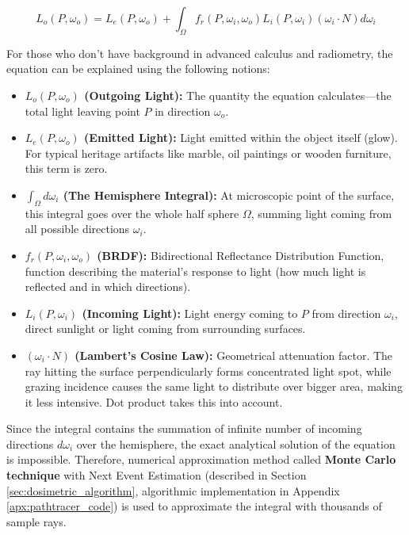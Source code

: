 \begin{equation}
    L_o(P, \omega_o) = L_e(P, \omega_o) + \int_{\Omega} f_r(P, \omega_i, \omega_o) L_i(P, \omega_i) (\omega_i \cdot N) d\omega_i
\end{equation}

For those who don't have background in advanced calculus and radiometry, the equation can be explained using the following notions:
\begin{itemize}
    \item \textbf{$L_o(P, \omega_o)$ (Outgoing Light):} The quantity the equation calculates—the total light leaving point $P$ in direction $\omega_o$.
    \item \textbf{$L_e(P, \omega_o)$ (Emitted Light):} Light emitted within the object itself (glow). For typical heritage artifacts like marble, oil paintings or wooden furniture, this term is zero.
    \item \textbf{$\int_{\Omega} d\omega_i$ (The Hemisphere Integral):} At microscopic point of the surface, this integral goes over the whole half sphere $\Omega$, summing light coming from all possible directions $\omega_i$.
    \item \textbf{$f_r(P, \omega_i, \omega_o)$ (BRDF):} Bidirectional Reflectance Distribution Function, function describing the material's response to light (how much light is reflected and in which directions).
    \item \textbf{$L_i(P, \omega_i)$ (Incoming Light):} Light energy coming to $P$ from direction $\omega_i$, direct sunlight or light coming from surrounding surfaces.
    \item \textbf{$(\omega_i \cdot N)$ (Lambert's Cosine Law):} Geometrical attenuation factor. The ray hitting the surface perpendicularly forms concentrated light spot, while grazing incidence causes the same light to distribute over bigger area, making it less intensive. Dot product takes this into account.
\end{itemize}

Since the integral contains the summation of infinite number of incoming directions $d\omega_i$ over the hemisphere, the exact analytical solution of the equation is impossible. Therefore, numerical approximation method called \textbf{Monte Carlo technique} with Next Event Estimation (described in Section \ref{sec:dosimetric_algorithm}, algorithmic implementation in Appendix \ref{apx:pathtracer_code}) is used to approximate the integral with thousands of sample rays.

